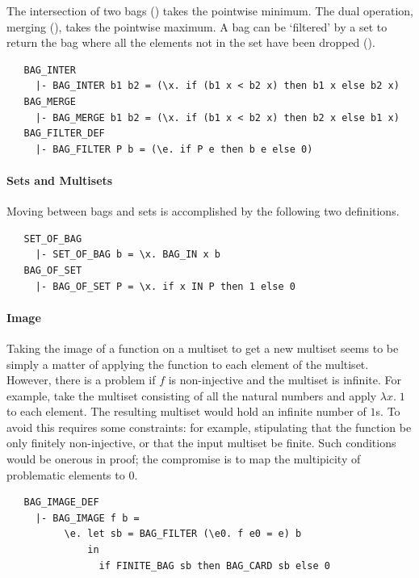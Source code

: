 {The intersection of two bags () takes the pointwise
minimum. The dual operation, merging (), takes the
pointwise maximum. A bag can be `filtered' by a set to return the bag
where all the elements not in the set have been dropped
().
%
\begin{hol}
\begin{verbatim}
   BAG_INTER
     |- BAG_INTER b1 b2 = (\x. if (b1 x < b2 x) then b1 x else b2 x)
   BAG_MERGE
     |- BAG_MERGE b1 b2 = (\x. if (b1 x < b2 x) then b2 x else b1 x)
   BAG_FILTER_DEF
     |- BAG_FILTER P b = (\e. if P e then b e else 0)
\end{verbatim}
\end{hol}

\paragraph {Sets and Multisets}

Moving between bags and sets is accomplished by the following two
definitions.
%
\begin{hol}
\begin{verbatim}
   SET_OF_BAG
     |- SET_OF_BAG b = \x. BAG_IN x b
   BAG_OF_SET
     |- BAG_OF_SET P = \x. if x IN P then 1 else 0
\end{verbatim}
\end{hol}

\paragraph {Image}

Taking the image of a function on a multiset to get a new multiset
seems to be simply a matter of applying the function to each element
of the multiset. However, there is a problem if $f$ is non-injective
and the multiset is infinite. For example, take the multiset
consisting of all the natural numbers and apply $\lambda x.\; 1$ to
each element. The resulting multiset would hold an infinite number of
$1$s. To avoid this requires some constraints: for example,
stipulating that the function be only finitely non-injective, or that
the input multiset be finite. Such conditions would be onerous in
proof; the compromise is to map the multipicity of problematic
elements to $0$.
%
\begin{hol}
\begin{verbatim}
   BAG_IMAGE_DEF
     |- BAG_IMAGE f b =
          \e. let sb = BAG_FILTER (\e0. f e0 = e) b
              in
                if FINITE_BAG sb then BAG_CARD sb else 0
\end{verbatim}
\end{hol}


}

